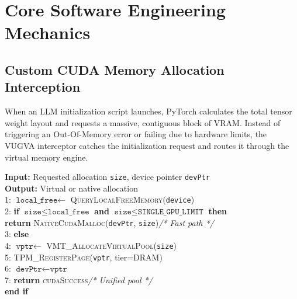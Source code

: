 \documentclass[11pt,twocolumn]{article}
\begin{document}
\section{Core Software Engineering Mechanics}
\label{sec:mechanics}

\subsection{Custom CUDA Memory Allocation Interception}
\label{sec:interception}

When an LLM initialization script launches, PyTorch calculates the total tensor weight layout and requests a massive, contiguous block of VRAM. Instead of triggering an Out-Of-Memory error or failing due to hardware limits, the VUGVA interceptor catches the initialization request and routes it through the virtual memory engine.

\begin{tcolorbox}[colback=codebg, colframe=vugvablue, title={\textbf{Algorithm 1:} VUGVA Memory Interception Hook}, fonttitle=\small]
\small\ttfamily
\textbf{Input:} Requested allocation \texttt{size}, device pointer \texttt{devPtr}\\
\textbf{Output:} Virtual or native allocation\\[4pt]
1: $\texttt{local\_free} \leftarrow$ \textsc{QueryLocalFreeMemory}(\texttt{device})\\
2: \textbf{if} $\texttt{size} \leq \texttt{local\_free}$ \textbf{and} $\texttt{size} \leq \texttt{SINGLE\_GPU\_LIMIT}$ \textbf{then}\\
\phantom{2: }\textbf{return} \textsc{NativeCudaMalloc}(\texttt{devPtr}, \texttt{size})\hfill{\textit{/* Fast path */}}\\
3: \textbf{else}\\
\phantom{3: }4: $\texttt{vptr} \leftarrow$ \textsc{VMT\_AllocateVirtualPool}(\texttt{size})\\
\phantom{3: }5: \textsc{TPM\_RegisterPage}(\texttt{vptr}, tier=\textsc{DRAM})\\
\phantom{3: }6: $\texttt{devPtr} \leftarrow \texttt{vptr}$\\
\phantom{3: }7: \textbf{return} \textsc{cudaSuccess}\hfill{\textit{/* Unified pool */}}\\
\textbf{end if}
\end{tcolorbox}
\end{document}

